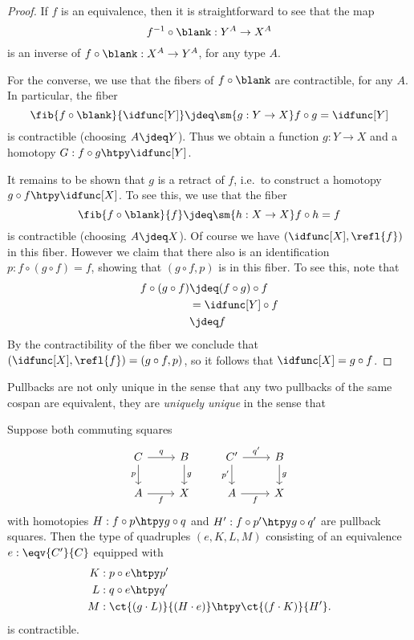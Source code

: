 \begin{proof}
If $f$ is an equivalence, then it is straightforward to see that the map
\begin{equation*}
f^{-1}\circ\blank : Y^A\to X^A
\end{equation*}
is an inverse of $f\circ \blank : X^A \to Y^A$, for any type $A$.

For the converse, we use that the fibers of $f\circ \blank$ are contractible, for any $A$. In particular, the fiber
\begin{equation*}
\fib{f\circ\blank}{\idfunc[Y]}\jdeq \sm{g:Y\to X} f\circ g=\idfunc[Y]
\end{equation*}
is contractible (choosing $A\jdeq Y$). Thus we obtain a function $g:Y\to X$ and a homotopy $G:f\circ g\htpy \idfunc[Y]$.

It remains to be shown that $g$ is a retract of $f$, i.e.~to construct a homotopy $g\circ f\htpy \idfunc[X]$. To see this, we use that the fiber
\begin{equation*}
\fib{f\circ\blank}{f}\jdeq \sm{h:X\to X} f\circ h=f
\end{equation*}
is contractible (choosing $A\jdeq X$). Of course we have $(\idfunc[X],\refl{f})$ in this fiber. However we claim that there also is an identification $p:f\circ (g\circ f)=f$, showing that $(g\circ f,p)$ is in this fiber. To see this, note that
\begin{align*}
f\circ (g\circ f) & \jdeq (f\circ g)\circ f \\
& = \idfunc[Y]\circ f \\
& \jdeq f
\end{align*}
By the contractibility of the fiber we conclude that $(\idfunc[X],\refl{f})=(g\circ f,p)$, so it follows that $\idfunc[X]=g\circ f$.
\end{proof}

Pullbacks are not only unique in the sense that any two pullbacks of the same cospan are equivalent, they are \emph{uniquely unique} in the sense that 

\begin{cor}
Suppose both commuting squares
\begin{equation*}
\begin{tikzcd}
C \arrow[r,"q"] \arrow[d,swap,"p"] & B \arrow[d,"g"] & {C'} \arrow[r,"{q'}"] \arrow[d,swap,"{p'}"] & B \arrow[d,"g"] \\
A \arrow[r,swap,"f"] & X & A \arrow[r,swap,"f"] & X
\end{tikzcd}
\end{equation*}
with homotopies $H:f\circ p \htpy g\circ q$ and $H':f\circ p'\htpy g\circ q'$ are pullback squares.
Then the type of quadruples $(e,K,L,M)$ consisting of an equivalence $e:\eqv{C'}{C}$ equipped with
\begin{align*}
K & : p\circ e \htpy p' \\
L & : q\circ e \htpy q' \\
M & : \ct{(g\cdot L)}{(H\cdot e)} \htpy \ct{(f\cdot K)}{H'}.
\end{align*}
is contractible.
\end{cor}

